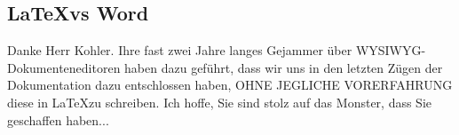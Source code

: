 \subsection{\LaTeX vs Word}\label{fz_LatexVsWord}
Danke Herr Kohler. 
Ihre fast zwei Jahre langes Gejammer über WYSIWYG-Dokumenteneditoren haben dazu geführt, dass wir uns in den letzten Zügen der Dokumentation dazu entschlossen haben, OHNE JEGLICHE VORERFAHRUNG diese in \LaTeX zu schreiben. 
Ich hoffe, Sie sind stolz auf das Monster, dass Sie geschaffen haben...
\newpage